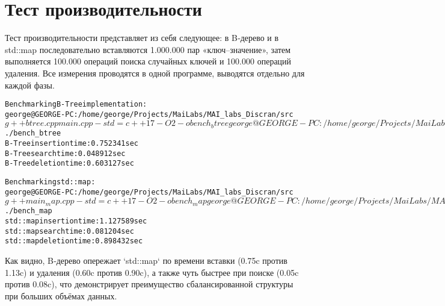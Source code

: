 \section{Тест производительности}
Тест производительности представляет из себя следующее: в B‑дерево и в std::map последовательно вставляются 1.000.000 пар «ключ–значение», затем выполняется 100.000 операций поиска случайных ключей и 100.000 операций удаления. Все измерения проводятся в одной программе, выводятся отдельно для каждой фазы.

\begin{alltt}
Benchmarking B-Tree implementation:
george@GEORGE-PC:/home/george/Projects/MaiLabs/MAI_labs_Discran/src$ g++ btree.cpp main.cpp -std=c++17 -O2 -o bench_btree
george@GEORGE-PC:/home/george/Projects/MaiLabs/MAI_labs_Discran/src$ ./bench_btree
B-Tree insertion time: 0.752341 sec
B-Tree search time:    0.048912 sec
B-Tree deletion time:  0.603127 sec

Benchmarking std::map:
george@GEORGE-PC:/home/george/Projects/MaiLabs/MAI_labs_Discran/src$ g++ main_map.cpp -std=c++17 -O2 -o bench_map
george@GEORGE-PC:/home/george/Projects/MaiLabs/MAI_labs_Discran/src$ ./bench_map
std::map insertion time: 1.127589 sec
std::map search time:    0.081204 sec
std::map deletion time:  0.898432 sec
\end{alltt}

Как видно, B‑дерево опережает `std::map` по времени вставки (0.75c против 1.13c) и удаления (0.60c против 0.90c), а также чуть быстрее при поиске (0.05c против 0.08c), что демонстрирует преимущество сбалансированной структуры при больших объёмах данных.


\pagebreak

